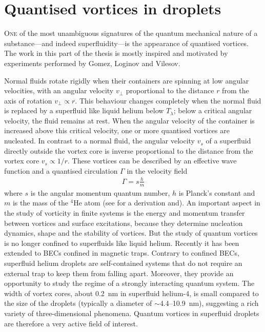 \chapter{Quantised vortices in droplets}\label{sec:quant-vort}
	\lettrine[lines=4]{\color{activeColor}O}{ne} of the most unambiguous signatures of the quantum mechanical nature of a substance---and indeed superfluidity---is the appearance of quantised vortices. The work in this part of the thesis is mostly inspired and motivated by experiments performed by Gomez, Loginov and Vilesov\citep{Gomez:2012,Gom14}. 
	
	Normal fluids rotate rigidly when their containers are spinning at low angular velocities, with an angular velocity $v_\perp$ proportional to the distance $r$ from the axis of rotation $v_\perp\propto r$. This behaviour changes completely when the normal fluid is replaced by a superfluid like liquid helium below $T_\lambda$; below a critical angular velocity, the fluid remains at rest. When the angular velocity of the container is increased above this critical velocity, one or more quantised vortices are nucleated. In contrast to a normal fluid, the angular velocity $v_s$ of a superfluid directly outside the vortex core is inverse proportional to the distance from the vortex core $v_s\propto 1/r$. These vortices can be described by an effective wave function and a quantised circulation $\Gamma$ in the velocity field
	\begin{align}
		\Gamma=s\frac{h}{m}	
	\end{align}
	where $s$ is the angular momentum quantum number, $h$ is Planck’s constant and $m$ is the mass of the $^4$He atom (see  for a derivation and). An important aspect in the study of vorticity in finite systems is the energy and momentum transfer between vortices and surface excitations, because they determine nucleation dynamics, shape and the stability of vortices. But the study of quantum vortices is no longer confined to superfluids like liquid helium. Recently\citep{Pit03,Fetter2009} it has been extended to BECs confined in magnetic traps. Contrary to confined BECs, superfluid helium droplets are self-contained systems that do not require an external trap to keep them from falling apart. Moreover, they provide an opportunity to study the regime of a strongly interacting quantum system. The width of vortex cores, about 0.2~nm\citep{Don91} in superfluid helium-4, is small compared to the size of the droplets (typically a diameter of $\sim$4.4--10.9~nm), suggesting a rich variety of three-dimensional phenomena. Quantum vortices in superfluid droplets are therefore a very active field of interest\citep{Clo98,Lehmann2003,Bar06,Sti06}. 
	
